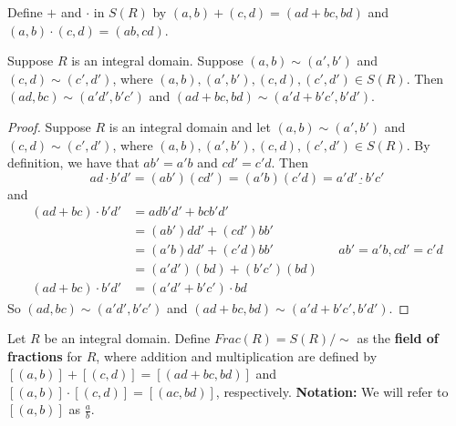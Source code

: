 \documentclass [12pt] {article}
\newenvironment{definition}[1]{\begin{tcolorbox}[title={Definition: #1},colback=blue!5!white,colframe=black!75!blue]}{\end{tcolorbox}}
\newenvironment{lemma}[1]{\begin{tcolorbox}[title={Lemma #1}]}{\end{tcolorbox}}
\renewcommand{\bf}[1]{\textbf{{#1}}}
\newcommand{\ul}[1]{\underline{{#1}}}
\begin{document}
\begin{definition}{Addition and Multiplication in $S(R)$}
    Define $+$ and $\cdot$ in $S(R)$ by $(a, b) + (c, d) = (ad + bc, bd)$ and
    $(a, b) \cdot (c, d) = (ab, cd)$.
\end{definition}
\begin{lemma}{}
    Suppose $R$ is an integral domain. Suppose $(a, b) \sim (a', b')$ and $(c, d) \sim (c', d')$,
    where $(a, b), (a', b'), (c, d), (c', d') \in S(R)$. Then $(ad, bc) \sim (a'd', b'c')$ and
    $(ad + bc, bd) \sim (a'd + b'c', b'd')$.
\end{lemma}
\begin{proof}
    Suppose $R$ is an integral domain and let $(a, b) \sim (a', b')$ and $(c, d) \sim (c', d')$,
    where $(a, b), (a', b'), (c, d), (c', d') \in S(R)$. By definition, we have that $ab' = a'b$
    and $cd' = c'd$. Then
    \[
        \ul{ad \cdot b'd'}
        = (ab')(cd')
        = (a'b)(c'd)
        = \ul{a'd' \cdot b'c'}
    \]
    and
    \begin{align*}
        (ad + bc) \cdot b'd' &= adb'd' + bcb'd' \\
                             &= (ab')dd' + (cd')bb' \\
                             &= (a'b)dd' + (c'd)bb' && ab' = a'b, cd' = c'd \\
                             &= (a'd')(bd) + (b'c')(bd) \\
        (ad + bc) \cdot b'd' &= (a'd' + b'c') \cdot bd
    \end{align*}
    So $(ad, bc) \sim (a'd', b'c')$ and $(ad + bc, bd) \sim (a'd + b'c', b'd')$.
\end{proof}

\begin{definition}{Field of Fractions}
    Let $R$ be an integral domain. Define $Frac(R) = S(R)/\sim$ as the \bf{field of fractions} for
    $R$, where addition and multiplication are defined by $[(a, b)] + [(c, d)] = [(ad + bc, bd)]$ and
    $[(a, b)] \cdot [(c, d)] = [(ac, bd)]$, respectively.
    \bf{Notation:} We will refer to $[(a, b)]$ as $\frac{a}{b}$.
\end{definition}
\end{document}
